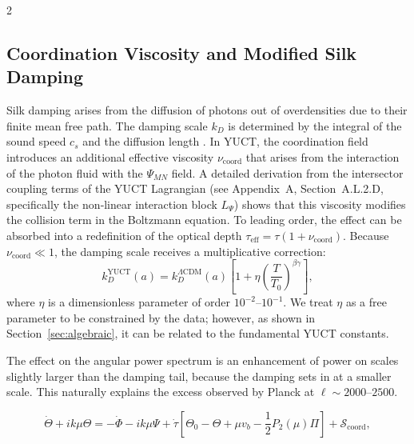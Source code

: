 \documentclass[11pt,a4paper]{article}
\begin{document}
\begin{multicols}{2}
		\subsection{Coordination Viscosity and Modified Silk Damping}
		
		Silk damping arises from the diffusion of photons out of overdensities due to their finite mean free path. The damping scale $k_D$ is determined by the integral of the sound speed $c_s$ and the diffusion length \cite{Silk1968}. In YUCT, the coordination field introduces an additional effective viscosity $\nu_{\mathrm{coord}}$ that arises from the interaction of the photon fluid with the $\Psi_{MN}$ field. A detailed derivation from the intersector coupling terms of the YUCT Lagrangian (see Appendix~A, Section~A.L.2.D, specifically the non‑linear interaction block \(L_{\Psi}\)) shows that this viscosity modifies the collision term in the Boltzmann equation. To leading order, the effect can be absorbed into a redefinition of the optical depth $\tau_{\mathrm{eff}} = \tau (1 + \nu_{\mathrm{coord}})$. Because $\nu_{\mathrm{coord}} \ll 1$, the damping scale receives a multiplicative correction:
		\begin{equation}
			k_D^{\text{YUCT}}(a) = k_D^{\Lambda\text{CDM}}(a) \left[1 + \eta \left(\frac{T}{T_0}\right)^{\beta\gamma}\right],
			\label{eq:kD}
		\end{equation}
		where $\eta$ is a dimensionless parameter of order $10^{-2}$--$10^{-1}$. We treat $\eta$ as a free parameter to be constrained by the data; however, as shown in Section~\ref{sec:algebraic}, it can be related to the fundamental YUCT constants.
		
		The effect on the angular power spectrum is an enhancement of power on scales slightly larger than the damping tail, because the damping sets in at a smaller scale. This naturally explains the excess observed by Planck at $\ell \sim 2000$--$2500$.
		
	\end{multicols}
	
	\begin{equation}
		\dot{\Theta} + ik\mu\Theta = -\dot{\Phi} - ik\mu\Psi + \dot{\tau}\left[\Theta_0 - \Theta + \mu v_b - \frac{1}{2}P_2(\mu)\Pi\right] + \mathcal{S}_{\mathrm{coord}},
		\label{eq:boltzmann}
	\end{equation}
	
\end{document}
